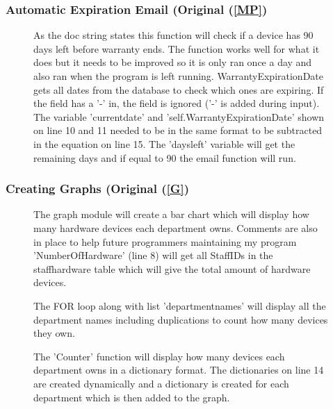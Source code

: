 \begin{landscape}
\subsubsection{Automatic Expiration Email (Original (\ref{MP})}

\begin{figure}[H]
\end{figure}

\begin{figure}[H]
    \caption{As the doc string states this function will check if a device has 90 days left before warranty ends. The function works well for what it does but it needs to be improved so it is only ran once a day and also ran when the program is left running. \newline WarrantyExpirationDate gets all dates from the database to check which ones are expiring. If the field has a '-' in, the field is ignored ('-' is added during input). \newline The variable 'currentdate' and 'self.WarrantyExpirationDate' shown on line 10 and 11 needed to be in the same format to be subtracted in the equation on line 15. The 'daysleft' variable will get the remaining days and if equal to 90 the email function will run. } 
\end{figure}

\subsubsection{Creating Graphs (Original (\ref{G})}

\begin{figure}[H]
    \caption{The graph module will create a bar chart which will display how many hardware devices each department owns. Comments are also in place to help future programmers maintaining my program \newline 'NumberOfHardware' (line 8) will get all StaffIDs in the staffhardware table which will give the total amount of hardware devices. }  
\end{figure}

\begin{figure}[H]
    \caption{The FOR loop along with list 'departmentnames' will display all the department names including duplications to count how many devices they own.}
\end{figure}

\begin{figure}[H]
    \caption{The 'Counter' function will display how many devices each department owns in a dictionary format. \newline The dictionaries on line 14 are created dynamically and a dictionary is created for each department which is then added to the graph.}
\end{figure}

\end{landscape}
